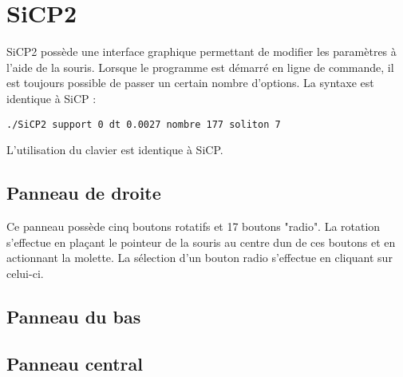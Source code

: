 %
\section{SiCP2}
%
%
SiCP2 possède une interface graphique permettant de modifier les paramètres à l'aide de la souris. Lorsque le programme est démarré en ligne de commande, il est toujours possible de passer un certain nombre d'options. La syntaxe est identique à SiCP :
\begin{center}
\texttt{./SiCP2 support 0 dt 0.0027 nombre 177 soliton 7}
\end{center}
L'utilisation du clavier est identique à SiCP.
%
%
%
\subsection{Panneau de droite}
%
Ce panneau possède cinq boutons rotatifs et 17 boutons "radio". La rotation s'effectue en plaçant le pointeur de la souris au centre dun de ces boutons et en actionnant la molette. La sélection d'un bouton radio s'effectue en cliquant sur celui-ci. 
%
%
%
\subsection{Panneau du bas}
%
%
%

%
%
%
\subsection{Panneau central}
%
%
%
%

